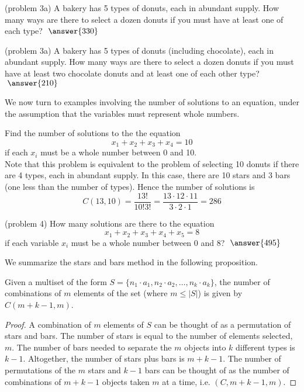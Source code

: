 \documentclass[handout]{ximera}
\begin{document}
\begin{problem}(problem 3a)
A bakery has 5 types of donuts, each in abundant supply. How many ways are there to select a dozen donuts if you must have at least one of each type? $\; \answer{330}$
\end{problem}

\begin{problem}(problem 3a)
A bakery has 5 types of donuts (including chocolate), each in abundant supply. How many ways are there to select a dozen donuts if you must have at least two chocolate donuts and at least one of each other type? $\; \answer{210}$
\end{problem}

We now turn to examples involving the number of solutions to an equation, under the assumption that 
the variables must represent whole numbers.

\begin{example}[example 4]
Find the number of solutions to the the equation
\[
x_1 + x_2 + x_3 + x_4 = 10
\]
if each $x_i$ must be a whole number between 0 and 10.\\
Note that this problem is equivalent to the problem of selecting 10 donuts if there are 4 types, each in abundant supply. In this case, there are 10 stars and 3 bars (one less than the number of types).  Hence the number of solutions is 
\[
C(13, 10) = \frac{13!}{10! 3!} = \frac{13 \cdot 12 \cdot 11}{3 \cdot 2 \cdot 1} = 286
\]
\end{example}

\begin{problem}(problem 4)
How many solutions are there to the equation
\[
x_1 + x_2 + x_3 + x_4 +x_5 = 8
\]
if each variable $x_i$ must be a whole number between 0 and 8? $\; \answer{495}$
\end{problem}

We summarize the stars and bars method in the following proposition.

\begin{proposition}
Given a multiset of the form $S = \{n_1 \cdot a_1, n_2 \cdot a_2, \ldots, n_k \cdot a_k\}$, 
the number of combinations of $m$ elements of the set (where $m \leq |S|$) is given by
$C(m+k-1, m)$.
\end{proposition}
\begin{proof}
A combination of $m$ elements of $S$ can be thought of as a permutation of stars and bars. 
The number of stars is equal to the number of elements selected, $m$. 
The number of bars needed to separate the $m$ objects into $k$ different types is $k-1$. 
Altogether, the number of stars plus bars is $m + k-1$. 
The number of permutations of the $m$ stars and $k-1$ bars can be thought of as 
the number of combinations of $m+k-1$ objects taken $m$ at a time, i.e. $(C, m+k-1,m)$. 
\end{proof}
\end{document}
